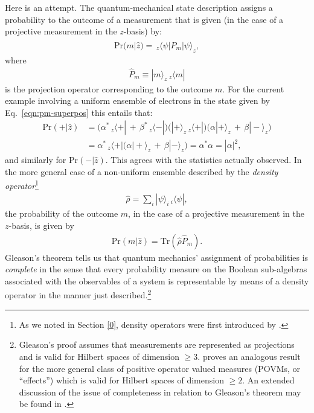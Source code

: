 Here is an attempt. The quantum-mechanical state description assigns a probability to the outcome of a measurement that is given (in the case of a projective measurement in the $z$-basis) by:
\begin{align}
\label{eqn:outcome-prob}
\mathrm{Pr}(m|\hat{z}) = \, _{z\!}\langle \psi | \hat{P}_m | \psi \rangle_{\!z},
\end{align}
where
\begin{align}
\label{eqn:projection}
\hat{P}_m \equiv |m\rangle_{\!z} \, _{z\!}\langle m|
\end{align}
is the projection operator corresponding to the outcome $m$. For the current example involving a uniform ensemble of electrons in the state given by Eq.\ \eqref{eqn:pm-superpos} this entails that:
\begin{align}
  \mathrm{Pr}(+| \hat{z}) & = \Big(\alpha^*\,_{z\!}\langle + | \,+\, \beta^*\,_{z\!}\langle - |\Big)\Big(| + \rangle_{\!z}\,_{z\!}\langle + | \Big) \Big(\alpha| + \rangle_{\!z} \,+\, \beta| - \rangle_{\!z}\Big) \nonumber \\[.3cm]
  & = \alpha^*\,_{z\!}\langle + |\Big(\alpha| + \rangle_{\!z} \,+\, \beta| - \rangle_{\!z}\Big) = \alpha^*\alpha = |\alpha|^2,
\end{align}
and similarly for $\mathrm{Pr}(-| \hat{z})$. This agrees with the statistics actually observed. In the more general case of a non-uniform ensemble described by the \emph{density operator}\footnote{As we noted in Section \ref{0}, density operators were first introduced by \citet{von Neumann 1927b}.}
\begin{align}
  \label{eqn:densityop}
  \hat{\rho} = \sum_i| \psi \rangle_{\!i} \, _{i\!}\langle \psi |,
\end{align}
the probability of the outcome $m$, in the case of a projective measurement in the $z$-basis, is given by
\begin{align}
  \label{eqn:probdensityop}
  \mathrm{Pr}(m|\hat{z}) = \mbox{Tr}(\hat{\rho} \hat{P}_m).
\end{align}
Gleason's theorem \citeyearpar{Gleason 1957} tells us that quantum mechanics' assignment of probabilities is \emph{complete} in the sense that every probability measure on the Boolean sub-algebras associated with the observables of a system is representable by means of a density operator in the manner just described.\footnote{Gleason's proof assumes that measurements are represented as projections and is valid for Hilbert spaces of dimension $\geq 3$. \citet[]{Busch 2003} proves an analogous result for the more general class of positive operator valued measures (POVMs, or ``effects'') which is valid for Hilbert spaces of dimension $\geq 2$. An extended discussion of the issue of completeness in relation to Gleason's theorem may be found in \citet[]{Demopoulos 2018}.}

